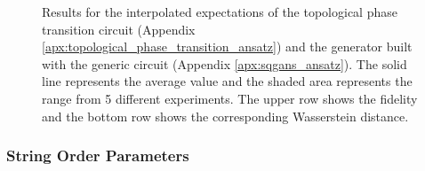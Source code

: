 \begin{figure}[htbp!]
  \caption{Results for the interpolated expectations of the topological phase transition circuit (Appendix
    \ref{apx:topological_phase_transition_ansatz}) and the generator built 
    with the generic circuit (Appendix \ref{apx:sqgans_ansatz}).
    The solid line represents the average value and the shaded area
    represents the range from 5 different experiments. The upper row shows the
    fidelity and the bottom row shows the corresponding Wasserstein distance. }
  \label{fig:wqgans_res_interpolated_1}
\end{figure}

\subsubsection{String Order Parameters}


